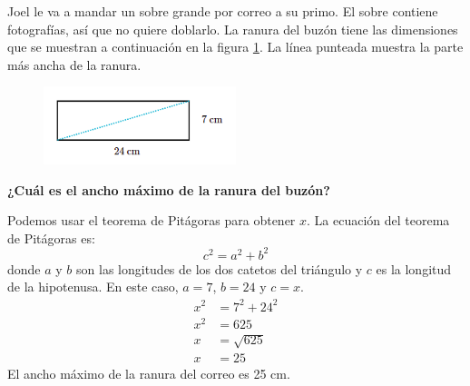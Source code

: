 Joel le va a mandar un sobre grande por correo a su primo. El sobre contiene fotografías, así que no quiere doblarlo.
La ranura del buzón tiene las dimensiones que se muestran a continuación en la figura \ref{fig:proverb_pitagoras_02}. La línea punteada muestra la parte más ancha de la ranura.
\begin{figure}[H]
    \begin{center}
        \includegraphics[width=0.5\textwidth]{../images/proverb_pitagoras_02.png}
    \end{center}
    \caption{}
    \label{fig:proverb_pitagoras_02}
\end{figure}
\textbf{¿Cuál es el ancho máximo de la ranura del buzón?}\\


\begin{solutionbox}{7cm}
    Podemos usar el teorema de Pitágoras para obtener $x$.
    La ecuación del teorema de Pitágoras es:
    \[c^2=a^2+b^2\]
    donde $a$ y $b$ son las longitudes de los dos catetos del triángulo y $c$ es la longitud de la hipotenusa.
    En este caso, $a=7$, $b=24$ y $c=x$.
    \begin{align*}
        x^2 & =7^2+24^2   \\
        x^2 & =625        \\
        x   & =\sqrt{625} \\
        x   & =25
    \end{align*}
    El ancho máximo de la ranura del correo es 25 cm.
\end{solutionbox}